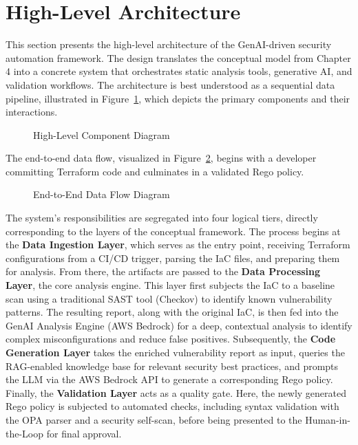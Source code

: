 \section{High-Level Architecture}

This section presents the high-level architecture of the GenAI-driven security automation framework. The design translates the conceptual model from Chapter 4 into a concrete system that orchestrates static analysis tools, generative AI, and validation workflows. The architecture is best understood as a sequential data pipeline, illustrated in Figure~\ref{fig:component_diagram}, which depicts the primary components and their interactions.

\begin{figure}[h!]
\centering
\caption{High-Level Component Diagram}
\label{fig:component_diagram}
\end{figure}

The end-to-end data flow, visualized in Figure~\ref{fig:data_flow_diagram}, begins with a developer committing Terraform code and culminates in a validated Rego policy.

\begin{figure}[h!]
\centering
\caption{End-to-End Data Flow Diagram}
\label{fig:data_flow_diagram}
\end{figure}

The system's responsibilities are segregated into four logical tiers, directly corresponding to the layers of the conceptual framework. The process begins at the \textbf{Data Ingestion Layer}, which serves as the entry point, receiving Terraform configurations from a CI/CD trigger, parsing the IaC files, and preparing them for analysis. From there, the artifacts are passed to the \textbf{Data Processing Layer}, the core analysis engine. This layer first subjects the IaC to a baseline scan using a traditional SAST tool (Checkov) to identify known vulnerability patterns. The resulting report, along with the original IaC, is then fed into the GenAI Analysis Engine (AWS Bedrock) for a deep, contextual analysis to identify complex misconfigurations and reduce false positives. Subsequently, the \textbf{Code Generation Layer} takes the enriched vulnerability report as input, queries the RAG-enabled knowledge base for relevant security best practices, and prompts the LLM via the AWS Bedrock API to generate a corresponding Rego policy. Finally, the \textbf{Validation Layer} acts as a quality gate. Here, the newly generated Rego policy is subjected to automated checks, including syntax validation with the OPA parser and a security self-scan, before being presented to the Human-in-the-Loop for final approval.

